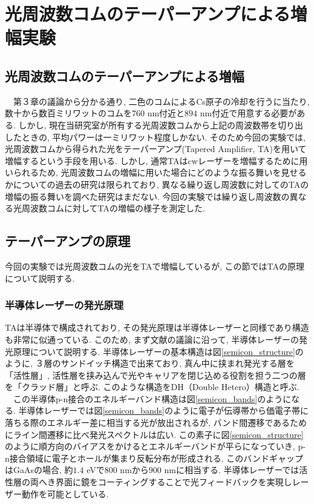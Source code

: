 \documentclass[uplatex, dvipdfmx, a4paper, report, papersize, 11pt]{jsbook}
\begin{document}
\newpage
\chapter{光周波数コムのテーパーアンプによる増幅実験}

\section{光周波数コムのテーパーアンプによる増幅}
　第３章の議論から分かる通り, 二色のコムによるCs原子の冷却を行うに当たり, 数十から数百ミリワットのコムを$760$ nm付近と$894$ nm付近で用意する必要がある. しかし, 現在当研究室が所有する光周波数コムから上記の周波数帯を切り出したときの, 平均パワーは一ミリワット程度しかない. そのため今回の実験では, 光周波数コムから得られた光をテーパーアンプ(Tapered Amplifier,  TA)を用いて増幅するという手段を用いる. しかし, 通常TAはcwレーザーを増幅するために用いられるため, 光周波数コムの増幅に用いた場合にどのような振る舞いを見せるかについての過去の研究は限られており, 異なる繰り返し周波数に対してのTAの増幅の振る舞いを調べた研究はまだない. 今回の実験では繰り返し周波数の異なる光周波数コムに対してTAの増幅の様子を測定した.

\section{テーパーアンプの原理}
今回の実験では光周波数コムの光をTAで増幅しているが, この節ではTAの原理について説明する.

\subsection{半導体レーザーの発光原理}
TAは半導体で構成されており, その発光原理は半導体レーザーと同様であり構造も非常に似通っている. このため, まず文献\cite{わかる半導体レーザーの基礎と応用}の議論に沿って, 半導体レーザーの発光原理について説明する. 半導体レーザーの基本構造は図\ref{semicon_structure}のように, ３層のサンドイッチ構造で出来ており, 真ん中に挟まれ発光する層を「活性層」, 活性層を挟み込んで光やキャリアを閉じ込める役割を担う二つの層を「クラッド層」と呼ぶ. このような構造をDH（Double Hetero）構造と呼ぶ.\\
　この半導体p-n接合のエネルギーバンド構造は図\ref{semicon_bands}のようになる. 半導体レーザーでは図\ref{semicon_bands}のように電子が伝導帯から価電子帯に落ちる際のエネルギー差に相当する光が放出されるが, バンド間遷移であるためにライン間遷移に比べ発光スペクトルは広い. この素子に図\ref{semicon_structure}のように順方向のバイアスをかけるとエネルギーバンドが平らになっていき, p-n接合領域に電子とホールが集まり反転分布が形成される. このバンドギャップはGaAsの場合, 約$1.4$ eVで$800$ nmから$900$ nmに相当する\cite{grynberg_aspect_fabre_cohen-tannoudji_2010}. 半導体レーザーでは活性層の両へき界面に鏡をコーティングすることで光フィードバックを実現しレーザー動作を可能としている.
\end{document}
